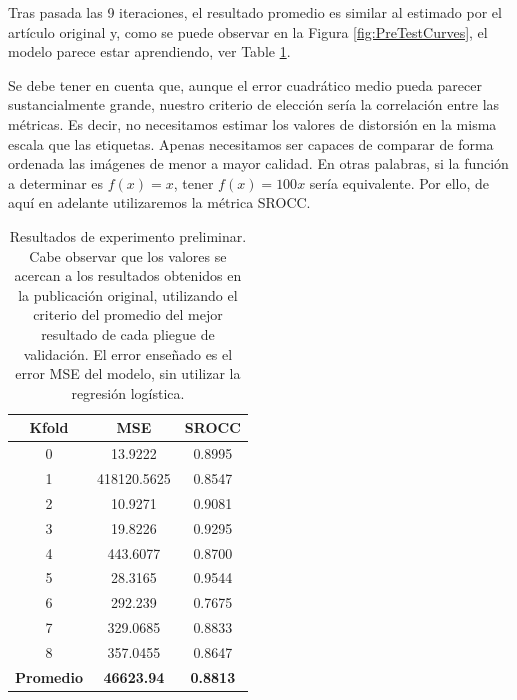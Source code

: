 Tras pasada las 9 iteraciones, el resultado promedio es similar al estimado 
por el artículo original y, como se puede observar en la Figura \ref{fig:PreTestCurves},
el modelo parece estar aprendiendo, ver Table \ref{tab:PreTestResults}. 

Se debe tener en cuenta que, aunque el error cuadrático medio pueda parecer 
sustancialmente grande, nuestro criterio de elección sería la correlación 
entre las métricas. Es decir, no necesitamos estimar los valores de distorsión 
en la misma escala que las etiquetas. Apenas necesitamos ser capaces de comparar 
de forma ordenada las imágenes de menor a mayor calidad. En otras palabras, 
si la función a determinar es $f(x) = x$, tener $f(x) = 100x$ sería equivalente.
Por ello, de aquí en adelante utilizaremos la métrica SROCC.

\begin{table}[htp]
  \scriptsize
  \begin{center}
    \begin{tabular}[c]{|c|c|c|}
      \hline
      \rowcolor[HTML]{FFC702}
      \textbf{Kfold} & \textbf{MSE} & \textbf{SROCC} \\ 
      \hline 
      0 & 13.9222 & 0.8995 \\
      \hline 
      1 & 418120.5625 & 0.8547 \\ 
      \hline 
      2 & 10.9271 & 0.9081 \\
      \hline 
      3 & 19.8226 & 0.9295 \\ 
      \hline 
      4 & 443.6077 & 0.8700 \\ 
      \hline 
      5 & 28.3165 & 0.9544 \\ 
      \hline 
      6 & 292.239 & 0.7675 \\ 
      \hline 
      7 & 329.0685 & 0.8833 \\ 
      \hline 
      8 & 357.0455 & 0.8647 \\ 
      \hline
      \textbf{\cellcolor[HTML]{FFC702}Promedio} & \textbf{46623.94} & \textbf{0.8813} \\ 
      \hline
    \end{tabular}
  \end{center}
  \caption[Resultados de experimento preliminar.]{Resultados de experimento preliminar. 
    Cabe observar que los valores se acercan a los resultados obtenidos en la publicación original, 
    utilizando el criterio del promedio del mejor resultado de cada pliegue de validación. 
    El error enseñado es el error MSE del modelo, sin utilizar la regresión logística.
}
  \label{tab:PreTestResults}
\end{table}

